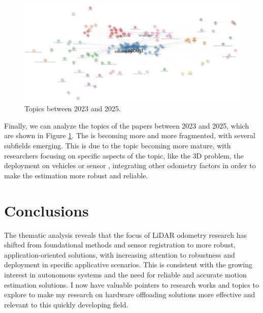 \documentclass{article}
\begin{document}
\begin{figure}[!htbp]
    \centering
    \includegraphics[width=1.0\textwidth]{img/topics_2023_2025.png}
    \caption{Topics between 2023 and 2025.}
    \label{fig:topics_2023_2025}
\end{figure}

Finally, we can analyze the topics of the papers between 2023 and 2025, which are shown in Figure \ref{fig:topics_2023_2025}. The is becoming more and more fragmented, with several subfields emerging. This is due to the topic becoming more mature, with researchers focusing on specific aspects of the topic, like the 3D  problem, the deployment on  vehicles or sensor , integrating other odometry factors in order to make the estimation more robust and reliable.

\section{Conclusions}
The thematic analysis reveals that the focus of LiDAR odometry research has shifted from foundational methods and sensor registration to more robust, application-oriented solutions, with increasing attention to robustness and deployment in specific applicative scenarios. This is consistent with the growing interest in autonomous systems and the need for reliable and accurate motion estimation solutions. I now have valuable pointers to research works and topics to explore to make my research on hardware offloading solutions more effective and relevant to this quickly developing field.




\end{document}
